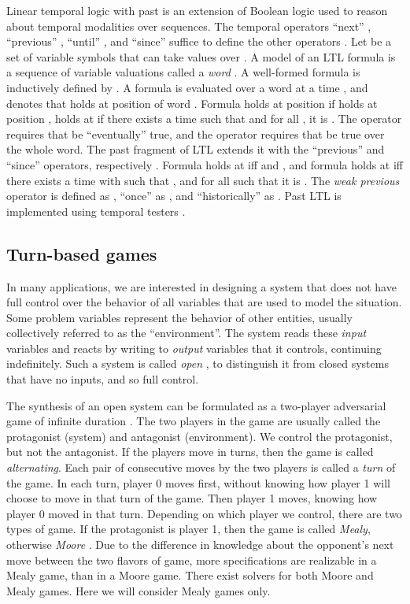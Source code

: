 \documentclass[copyright]{eptcs}
\begin{document}
Linear temporal logic with past is an extension of Boolean logic used to reason about temporal modalities over sequences.
The temporal operators “next” , “previous” , “until” , and “since”  suffice to define the other operators \cite{Pnueli77,Baier08}.
Let  be a set of variable symbols  that can take values over .
A model of an LTL formula is a sequence of variable valuations called a {\em word} .
A well-formed formula is inductively defined by
.
A formula  is evaluated over a word  at a time , and  denotes that  holds at position  of word .
Formula  holds at position  if  holds at position ,
 holds at  if there exists a time  such that  and for all , it is .
The operator  requires that  be “eventually” true, and the operator  requires that  be true over the whole word.
The past fragment of LTL extends it with the “previous” and “since” operators,  respectively \cite{Lichtenstein85clp,Manna89lncs,Kesten1998icalp}.
Formula  holds at  iff  and , and
formula  holds at  iff there exists a time  with  such that , and for all  such that  it is .
The {\em weak previous} operator  is defined as ,
“once”  as , and
“historically”  as .
Past LTL is implemented using temporal testers \cite{Kesten1998icalp}.


\subsection{Turn-based games}

In many applications, we are interested in designing a system that does not have full control over the behavior of all variables that are used to model the situation.
Some problem variables represent the behavior of other entities, usually collectively referred to as the “environment”.
The system reads these {\em input} variables and reacts by writing to {\em output} variables that it controls, continuing indefinitely.
Such a system is called {\em open} \cite{Abadi94podc,Pnueli89popl}, to distinguish it from closed systems that have no inputs, and so full control.

The synthesis of an open system can be formulated as a two-player adversarial game of infinite duration \cite{Thomas08npgi}.
The two players in the game are usually called the protagonist (system) and antagonist (environment).
We control the protagonist, but not the antagonist.
If the players move in turns, then the game is called {\em alternating}.
Each pair of consecutive moves by the two players is called a {\em turn} of the game.
In each turn, player 0 moves first, without knowing how player 1 will choose to move in that turn of the game.
Then player 1 moves, knowing how player 0 moved in that turn.
Depending on which player we control, there are two types of game.
If the protagonist is player 1, then the game is called {\em Mealy}, otherwise {\em Moore}  \cite{Mealy55,Moore56}.
Due to the difference in knowledge about the opponent's next move between the two flavors of game, more specifications are realizable in a Mealy game, than in a Moore game.
There exist solvers for both Moore and Mealy games.
Here we will consider Mealy games only.
\end{document}
